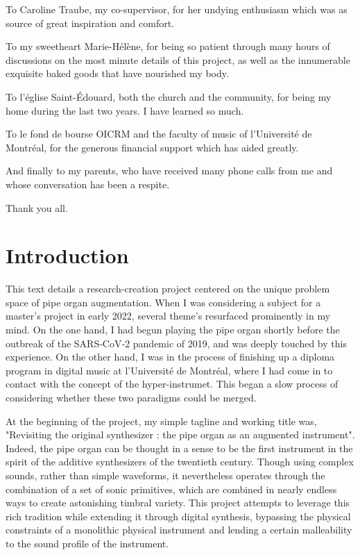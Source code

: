 \documentclass[12pt,twoside,maitrise]{dms_ks}
\theoremstyle{definition}
\begin{document}
To Caroline Traube, my co-supervisor, for her undying enthusiasm which was as source of great inspiration and comfort.

To my sweetheart Marie-Hélène, for being so patient through many hours of discussions on the most minute details of this project, as well as the innumerable exquisite baked goods that have nourished my body.

To l'église Saint-Édouard, both the church and the community, for being my home during the last two years. I have learned so much.

To le fond de bourse OICRM and the faculty of music of l'Université de Montréal, for the generous financial support which has aided greatly.

And finally to my parents, who have received many phone calls from me and whose conversation has been a respite.

Thank you all.


\NoChapterPageNumber
\cleardoublepage


\chapter*{Introduction}

This text details a research-creation project centered on the unique problem space of pipe organ augmentation. 
When I was considering a subject for a master's project in early 2022, several theme's resurfaced prominently in my mind. 
On the one hand, I had begun playing the pipe organ shortly before the outbreak of the SARS‑CoV‑2 pandemic of 2019, and was deeply touched by this experience. 
On the other hand, I was in the process of finishing up a diploma program in digital music at l'Université de Montréal, where I had come in to contact with the concept of the hyper-instrumet. 
This began a slow process of considering whether these two paradigms could be merged. 

At the beginning of the project, my simple tagline and working title was, "Revisiting the original synthesizer : the pipe organ as an augmented instrument". 
Indeed, the pipe organ can be thought in a sense to be the first instrument in the spirit of the additive synthesizers of the twentieth century. 
Though using complex sounds, rather than simple waveforms, it nevertheless operates through the combination of a set of sonic primitives, which are combined in nearly endless ways to create astonishing timbral variety. 
This project attempts to leverage this rich tradition while extending it through digital synthesis, bypassing the physical constraints of a monolithic physical instrument and lending a certain malleability to the sound profile of the instrument.
\end{document}
